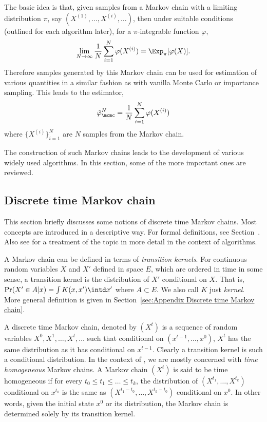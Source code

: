 The basic idea is that, given samples from a Markov chain with a limiting
distribution $\pi$, say $(X^{(1)},\dots,X^{(i)},\dots)$, then under suitable
conditions (outlined for each algorithm later), for a $\pi$-integrable
function $\varphi$,
\begin{equation}
  \lim_{N\to\infty}\frac{1}{N}\sum_{i=1}^N\varphi(X^{(i)}) =
  \Exp_{\pi}[\varphi(X)].
  \label{eq:mcmc convergence}
\end{equation}
Therefore samples generated by this Markov chain can be used for estimation
of various quantities in a similar fashion as with vanilla Monte Carlo or
importance sampling. This leads to the estimator,
\begin{equation}
  \hat\varphi_{\mcmc}^N = \frac{1}{N}\sum_{i=1}^N\varphi(X^{(i)})
  \label{eq:mcmc est}
\end{equation}
where $\{X^{(i)}\}_{i=1}^N$ are $N$ samples from the Markov chain.

The construction of such Markov chains leads to the development of various
widely used \mcmc algorithms. In this section, some of the more important
ones are reviewed.

\subsection{Discrete time Markov chain}
\label{sub:Discrete time Markov chain}

This section briefly discusses some notions of discrete time Markov chains.
Most concepts are introduced in a descriptive way. For formal definitions,
see Section~. Also see
\cite[][chap.~6]{Robert:2004tn} for a treatment of the topic in more detail
in the context of \mcmc algorithms.

A Markov chain can be defined in terms of \emph{transition kernels}. For
continuous random variables $X$ and $X'$ defined in space $E$, which are
ordered in time in some sense, a transition kernel is the distribution of
$X'$ conditional on $X$. That is, $\Pr(X'\in A|x) = \int K(x,x')\intd x'$
where $A\subset E$. We also call $K$ just \emph{kernel}. More general
definition is given in Section~\ref{sec:Appendix Discrete time Markov chain}.

A discrete time Markov chain, denoted by $(X^t)$ is a sequence of random
variables $X^0,X^1,\dots,X^t,\dots$ such that conditional on
$(x^{t-1},\dots,x^0)$, $X^t$ has the same distribution as it has conditional
on $x^{t-1}$. Clearly a transition kernel is such a conditional distribution.
In the context of \mcmc, we are mostly concerned with \emph{time homogeneous}
Markov chains. A Markov chain $(X^t)$ is said to be time homogeneous if for
every $t_0\le t_1\le\dots\le t_k$, the distribution of
$(X^{t_1},\dots,X^{t_k})$ conditional on $x^{t_0}$ is the same as
$(X^{t_1-t_0},\dots,X^{t_k-t_0})$ conditional on $x^0$. In other words, given
the initial state $x^0$ or its distribution, the Markov chain is determined
solely by its transition kernel.

